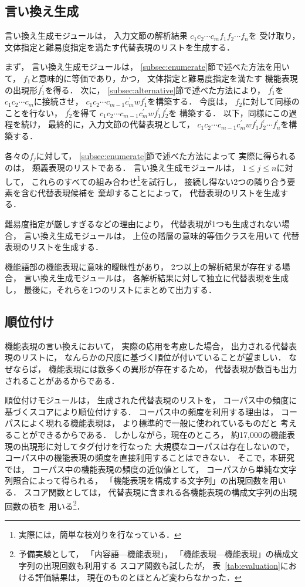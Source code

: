 \documentclass[japanese]{jnlp_1.4}
\begin{document}
\subsection{言い換え生成}

言い換え生成モジュールは，
入力文節の解析結果
$c_1 c_2 \cdots c_m f_1 f_2 \cdots f_n$を
受け取り，
文体指定と難易度指定を満たす代替表現のリストを生成する．

まず，
言い換え生成モジュールは，
\ref{subsec:enumerate}節で述べた方法を用いて，
$f_1$と意味的に等価であり，かつ，
文体指定と難易度指定を満たす
機能表現の出現形$f_1^\prime$を得る．
次に，
\ref{subsec:alternative}節で述べた方法により，
$f_1^\prime$を$c_1 c_2 \cdots c_m$に接続させ，
$c_1 c_2 \cdots c_{m-1} c_m^\prime w f_1^\prime$を構築する．
今度は，
$f_2$に対して同様のことを行ない，
$f_2^\prime$を得て
$c_1 c_2 \cdots c_{m-1} c_m^\prime w f_1^\prime f_2^\prime$を
構築する．
以下，同様にこの過程を続け，
最終的に，入力文節の代替表現として，
$c_1 c_2 \cdots c_{m-1} c_m^\prime w 
f_1^\prime f_2^\prime \cdots f_n^\prime$を構築する．

各々の$f_j$に対して，
\ref{subsec:enumerate}節で述べた方法によって
実際に得られるのは，
類義表現のリストである．
言い換え生成モジュールは，
$1 \leq j \leq n$に対して，
これらのすべての組み合わせ\footnote{
	実際には，簡単な枝刈りを行なっている．
}を試行し，
接続し得ない2つの隣り合う要素を含む代替表現候補を
棄却することによって，
代替表現のリストを生成する．

難易度指定が厳しすぎるなどの理由により，
代替表現が1つも生成されない場合，
言い換え生成モジュールは，
上位の階層の意味的等価クラスを用いて
代替表現のリストを生成する．

機能語部の機能表現に意味的曖昧性があり，
2つ以上の解析結果が存在する場合，
言い換え生成モジュールは，
各解析結果に対して独立に代替表現を生成し，
最後に，それらを1つのリストにまとめて出力する．


\subsection{順位付け}
\label{subsec:ranking}

機能表現の言い換えにおいて，
実際の応用を考慮した場合，
出力される代替表現のリストに，
なんらかの尺度に基づく順位が付いていることが望ましい．
なぜならば，
機能表現には数多くの異形が存在するため，
代替表現が数百も出力されることがあるからである．

順位付けモジュールは，
生成された代替表現のリストを，
コーパス中の頻度に基づくスコアにより順位付けする．
コーパス中の頻度を利用する理由は，
コーパスによく現れる機能表現は，
より標準的で一般に使われているものだと
考えることができるからである．
しかしながら，現在のところ，
約17,000の機能表現の出現形に対してタグ付けを行なった
大規模なコーパスは存在しないので，
コーパス中の機能表現の頻度を直接利用することはできない．
そこで，本研究では，
コーパス中の機能表現の頻度の近似値として，
コーパスから単純な文字列照合によって得られる，
「機能表現を構成する文字列」の出現回数を用いる．
スコア関数としては，
代替表現に含まれる各機能表現の構成文字列の出現回数の積を
用いる\footnote{
	予備実験として，
	「内容語—機能表現」，
	「機能表現—機能表現」の構成文字列の出現回数も利用する
	スコア関数も試したが，
	表~\ref{tab:evaluation}における評価結果は，
	現在のものとほとんど変わらなかった．
}．
\end{document}

